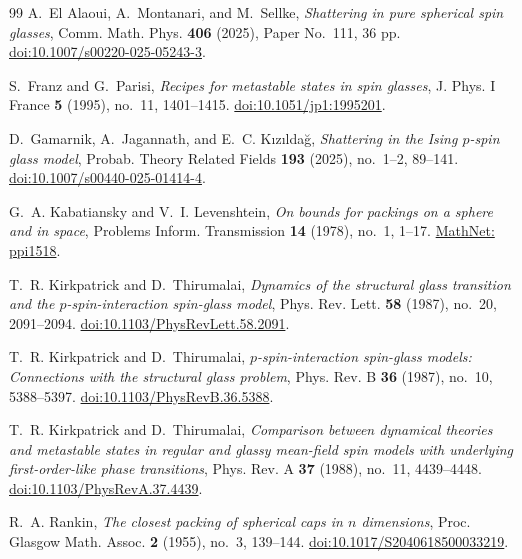 \documentclass[11pt,reqno]{amsart}
\numberwithin{equation}{section}
\theoremstyle{plain}
\theoremstyle{definition}
\theoremstyle{remark}
\newcommand{\1}{\mathbf 1}
\begin{document}
\begin{thebibliography}{99}
A.~El Alaoui, A.~Montanari, and M.~Sellke,
\emph{Shattering in pure spherical spin glasses},
Comm. Math. Phys. \textbf{406} (2025), Paper No.~111, 36 pp.
\href{https://doi.org/10.1007/s00220-025-05243-3}
{doi:10.1007/s00220-025-05243-3}.

S.~Franz and G.~Parisi,
\emph{Recipes for metastable states in spin glasses},
J. Phys. I France \textbf{5} (1995), no.~11, 1401--1415.
\href{https://doi.org/10.1051/jp1:1995201}{doi:10.1051/jp1:1995201}.

D.~Gamarnik, A.~Jagannath, and E.~C. K{\i}z{\i}lda\u{g},
\emph{Shattering in the Ising \(p\)-spin glass model},
Probab. Theory Related Fields \textbf{193} (2025), no.~1--2, 89--141.
\href{https://doi.org/10.1007/s00440-025-01414-4}
{doi:10.1007/s00440-025-01414-4}.

G.~A. Kabatiansky and V.~I. Levenshtein,
\emph{On bounds for packings on a sphere and in space},
Problems Inform. Transmission \textbf{14} (1978), no.~1, 1--17.
\href{https://www.mathnet.ru/eng/ppi1518}{MathNet: ppi1518}.

T.~R. Kirkpatrick and D.~Thirumalai,
\emph{Dynamics of the structural glass transition and the
\(p\)-spin-interaction spin-glass model},
Phys. Rev. Lett. \textbf{58} (1987), no.~20, 2091--2094.
\href{https://doi.org/10.1103/PhysRevLett.58.2091}
{doi:10.1103/PhysRevLett.58.2091}.

T.~R. Kirkpatrick and D.~Thirumalai,
\emph{\(p\)-spin-interaction spin-glass models: Connections with the
structural glass problem},
Phys. Rev. B \textbf{36} (1987), no.~10, 5388--5397.
\href{https://doi.org/10.1103/PhysRevB.36.5388}
{doi:10.1103/PhysRevB.36.5388}.

T.~R. Kirkpatrick and D.~Thirumalai,
\emph{Comparison between dynamical theories and metastable states in
regular and glassy mean-field spin models with underlying
first-order-like phase transitions},
Phys. Rev. A \textbf{37} (1988), no.~11, 4439--4448.
\href{https://doi.org/10.1103/PhysRevA.37.4439}
{doi:10.1103/PhysRevA.37.4439}.

R.~A. Rankin,
\emph{The closest packing of spherical caps in \(n\) dimensions},
Proc. Glasgow Math. Assoc. \textbf{2} (1955), no.~3, 139--144.
\href{https://doi.org/10.1017/S2040618500033219}
{doi:10.1017/S2040618500033219}.


\end{thebibliography}
\end{document}
